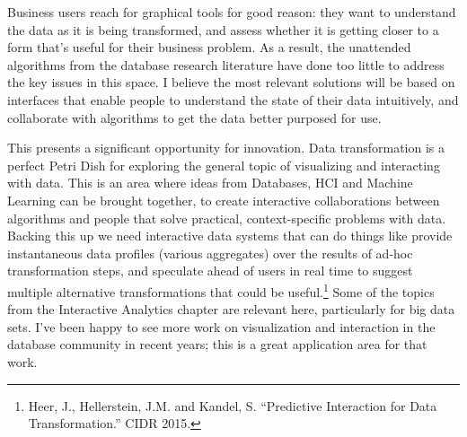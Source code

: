 \documentclass[b5paper,11pt,twoside,openright]{book}
\begin{document}
Business users reach for graphical tools for good reason: they want to
understand the data as it is being transformed, and assess whether it is
getting closer to a form that's useful for their business problem. As a
result, the unattended algorithms from the database research literature
have done too little to address the key issues in this space. I believe
the most relevant solutions will be based on interfaces that enable
people to understand the state of their data intuitively, and
collaborate with algorithms to get the data better purposed for use.

This presents a significant opportunity for innovation. Data
transformation is a perfect Petri Dish for exploring the general topic
of visualizing and interacting with data. This is an area where ideas
from Databases, HCI and Machine Learning can be brought together, to
create interactive collaborations between algorithms and people that
solve practical, context-specific problems with data. Backing this up we
need interactive data systems that can do things like provide
instantaneous data profiles (various aggregates) over the results of
ad-hoc transformation steps, and speculate ahead of users in real time
to suggest multiple alternative transformations that could be
useful.\footnote{Heer, J., Hellerstein, J.M. and Kandel, S. ``Predictive Interaction
  for Data Transformation.'' CIDR 2015.} Some of the topics
from the Interactive Analytics chapter are relevant here, particularly
for big data sets. I've been happy to see more work on visualization and
interaction in the database community in recent years; this is a great
application area for that work.
\end{document}
